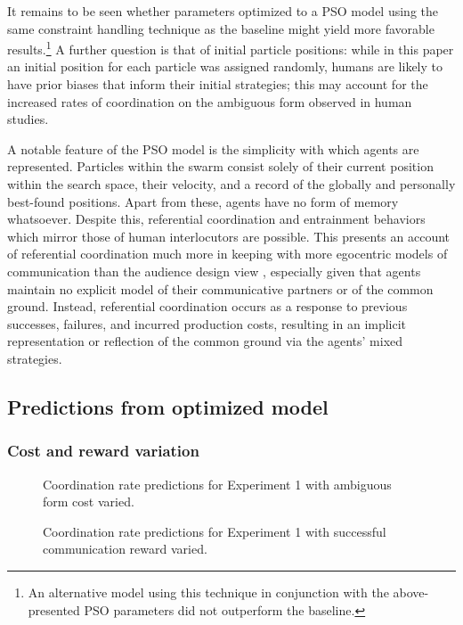 \documentclass[11pt]{article}
\begin{document}
It remains to be seen whether parameters optimized to a PSO model using the same constraint handling technique as the baseline might yield more favorable results.\footnote{An alternative model using this technique in conjunction with the above-presented PSO parameters did not outperform the baseline.} A further question is that of initial particle positions: while in this paper an initial position for each particle was assigned randomly, humans are likely to have prior biases that inform their initial strategies; this may account for the increased rates of coordination on the ambiguous form observed in human studies.

A notable feature of the PSO model is the simplicity with which agents are represented. Particles within the swarm consist solely of their current position within the search space, their velocity, and a record of the globally and personally best-found positions. Apart from these, agents have no form of memory whatsoever. Despite this, referential coordination and entrainment behaviors which mirror those of human interlocutors are possible. This presents an account of referential coordination much more in keeping with more egocentric models of communication \citep{horton1996} than the audience design view \citep{clark1982}, especially given that agents maintain no explicit model of their communicative partners or of the common ground. Instead, referential coordination occurs as a response to previous successes, failures, and incurred production costs, resulting in an implicit representation or reflection of the common ground via the agents' mixed strategies. 


\subsection{Predictions from optimized model}
\subsubsection{Cost and reward variation}

\begin{figure}[t]
\centering
\scalebox{.475}{}
\caption{Coordination rate predictions for Experiment 1 with ambiguous form cost varied.}
\label{fig:3}
\end{figure}

\begin{figure}[t]
\centering
\scalebox{.475}{}
\caption{Coordination rate predictions for Experiment 1 with successful communication reward varied.}
\label{fig:4}
\end{figure}
\end{document}
